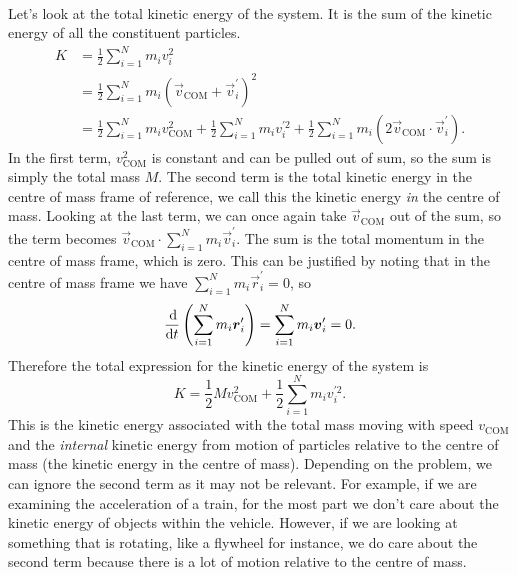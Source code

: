 \documentclass[../classical_mechanics.tex]{subfiles}
\begin{document}
        \paragraph{}
        Let's look at the total kinetic energy of the system.
        It is the sum of the kinetic energy of all the constituent particles.
        \begin{align}
            K&=\frac{1}{2}\sum_{i=1}^N m_iv_i^2\\
            &=\frac{1}{2}\sum_{i=1}^N m_i(\vec{v}_\text{COM}+\vec{v}_i^\prime)^2\\
            &=\frac{1}{2}\sum_{i=1}^N m_i v_\text{COM}^2+\frac{1}{2}\sum_{i=1}^N m_i v_i^{\prime 2}+\frac{1}{2}\sum_{i=1}^N m_i(2\vec{v}_\text{COM}\cdot\vec{v}_i^\prime).
        \end{align}
        In the first term, $v_\text{COM}^2$ is constant and can be pulled out of sum, so the sum is simply the total mass $M$.
        The second term is the total kinetic energy in the centre of mass frame of reference, we call this the kinetic energy \textit{in} the centre of mass.
        Looking at the last term, we can once again take $\vec{v}_\text{COM}$ out of the sum, so the term becomes $\vec{v}_\text{COM}\cdot\sum_{i=1}^N m_i\vec{v}_i^\prime$.
        The sum is the total momentum in the centre of mass frame, which is zero.
        This can be justified by noting that in the centre of mass frame we have $\sum_{i=1}^N m_i\vec{r}_i^\prime=0$, so
        \begin{equation}
            \dv{}{t}\left(\sum_{i=1}^N m_i\vec{r}_i^\prime\right)=\sum_{i=1}^N m_i\vec{v}_i^\prime=0.
        \end{equation}
        Therefore the total expression for the kinetic energy of the system is
        \begin{equation}
            K=\frac{1}{2}M v_\text{COM}^2+\frac{1}{2}\sum_{i=1}^N m_i v_i^{\prime 2}.
        \end{equation}
        This is the kinetic energy associated with the total mass moving with speed $v_\text{COM}$ and the \textit{internal} kinetic energy from motion of particles relative to the centre of mass (the kinetic energy in the centre of mass).
        Depending on the problem, we can ignore the second term as it may not be relevant.
        For example, if we are examining the acceleration of a train, for the most part we don't care about the kinetic energy of objects within the vehicle.
        However, if we are looking at something that is rotating, like a flywheel for instance, we do care about the second term because there is a lot of motion relative to the centre of mass.
\end{document}
